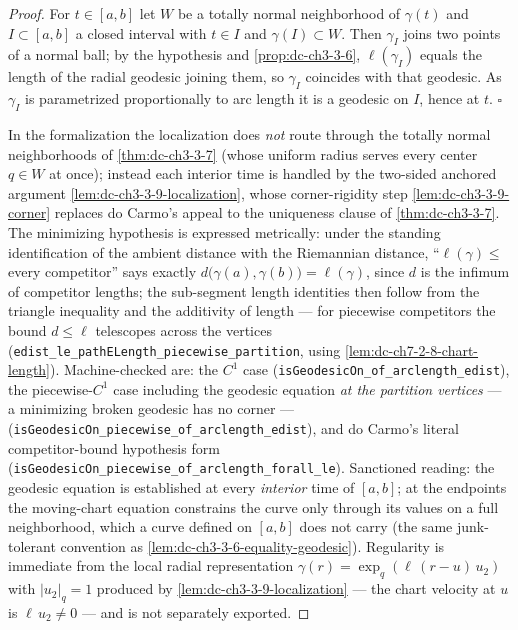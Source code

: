\begin{proof}
  \leanok
  For $t\in[a,b]$ let $W$ be a totally normal neighborhood of $\gamma(t)$
  and $I\subset[a,b]$ a closed interval with $t\in I$ and $\gamma(I)\subset W$.
  Then $\gamma_I$ joins two points of a normal ball; by the hypothesis and
  \cref{prop:dc-ch3-3-6}, $\ell(\gamma_I)$ equals the length of the radial geodesic joining
  them, so $\gamma_I$ coincides with that geodesic. As $\gamma_I$ is parametrized
  proportionally to arc length it is a geodesic on $I$, hence at $t$. $\square$

  In the formalization the localization does \emph{not} route through the
  totally normal neighborhoods of \cref{thm:dc-ch3-3-7} (whose uniform
  radius serves every center $q\in W$ at once); instead each interior time
  is handled by the two-sided anchored argument
  \cref{lem:dc-ch3-3-9-localization}, whose corner-rigidity step
  \cref{lem:dc-ch3-3-9-corner} replaces do Carmo's appeal to the uniqueness
  clause of \cref{thm:dc-ch3-3-7}. The minimizing hypothesis is expressed
  metrically: under the standing identification of the ambient distance with
  the Riemannian distance, ``$\ell(\gamma)\le$ every competitor'' says
  exactly $d\big(\gamma(a),\gamma(b)\big)=\ell(\gamma)$, since $d$ is the
  infimum of competitor lengths; the sub-segment length identities then
  follow from the triangle inequality and the additivity of length — for
  piecewise competitors the bound $d\le\ell$ telescopes across the vertices
  (\texttt{edist\_le\_pathELength\_piecewise\_partition}, using
  \cref{lem:dc-ch7-2-8-chart-length}). Machine-checked are: the $C^1$ case
  (\texttt{isGeodesicOn\_of\_arclength\_edist}), the piecewise-$C^1$ case
  including the geodesic equation \emph{at the partition vertices} — a
  minimizing broken geodesic has no corner —
  (\texttt{isGeodesicOn\_piecewise\_of\_arclength\_edist}), and do Carmo's
  literal competitor-bound hypothesis form
  (\texttt{isGeodesicOn\_piecewise\_of\_arclength\_forall\_le}). Sanctioned
  reading: the geodesic equation is established at every \emph{interior}
  time of $[a,b]$; at the endpoints the moving-chart equation constrains the
  curve only through its values on a full neighborhood, which a curve
  defined on $[a,b]$ does not carry (the same junk-tolerant convention as
  \cref{lem:dc-ch3-3-6-equality-geodesic}). Regularity is immediate from the
  local radial representation $\gamma(r)=\exp_q(\ell\,(r-u)\,u_2)$ with
  $|u_2|_q=1$ produced by \cref{lem:dc-ch3-3-9-localization} — the chart
  velocity at $u$ is $\ell\,u_2\ne0$ — and is not separately exported.
\end{proof}

